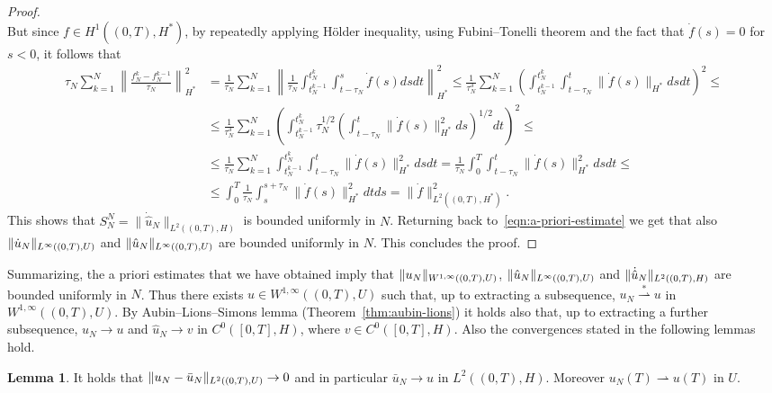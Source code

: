 \documentclass[a4paper,10pt,twoside]{amsbook}
\numberwithin{section}{chapter}
\numberwithin{equation}{chapter}
\theoremstyle{definition}
\newtheorem{lemma}[prop]{Lemma}
\DeclarePairedDelimiter{\norm}{\lVert}{\rVert}
\begin{document}
\begin{proof}
\[\]
But since $f\in H^1((0,T),H^*)$, by repeatedly applying H\"older inequality, using Fubini--Tonelli theorem and the fact that $\dot f(s)=0$ for $s<0$, it follows that
\[
\begin{split}
\tau_N\sum_{k=1}^N\left\|\frac{f_N^k-f_N^{k-1}}{\tau_N}\right\|_{H^*}^2&=\frac{1}{\tau_N}\sum_{k=1}^N\left\|\frac{1}{\tau_N}\int_{t_N^{k-1}}^{t_N^k}\int_{t-\tau_N}^s\dot{f}(s)dsdt\right\|_{H^*}^2\le\frac{1}{\tau_N^3}\sum_{k=1}^N\left(\int_{t_N^{k-1}}^{t_N^k}\int_{t-\tau_N}^t\|\dot{f}(s)\|_{H^*}dsdt\right)^2\le\\
&\le\frac{1}{\tau_N^3}\sum_{k=1}^N\left(\int_{t_N^{k-1}}^{t_N^k}\tau_N^{1/2}\left(\int_{t-\tau_N}^t\|\dot{f}(s)\|_{H^*}^2ds\right)^{1/2}dt\right)^2\le\\
&\le\frac{1}{\tau_N}\sum_{k=1}^N\int_{t_N^{k-1}}^{t_N^k}\int_{t-\tau_N}^t\|\dot{f}(s)\|_{H^*}^2dsdt=\frac{1}{\tau_N}\int_0^T\int_{t-\tau_N}^t\|\dot{f}(s)\|_{H^*}^2dsdt\le\\
&\le\int_0^T\frac{1}{\tau_N}\int_s^{s+\tau_N}\|\dot{f}(s)\|_{H^*}^2dtds=\|\dot{f}\|_{L^2((0,T),H^*)}^2.
\end{split}
\]
This shows that $S_N^N=\|\dot{\hat{u}}_N\|_{L^2((0,T),H)}$ is bounded uniformly in $N$. Returning back to~\eqref{eqn:a-priori-estimate} we get that also $\norm{\dot u_N}_{L^\infty((0,T),U)}$ and $\norm{\hat u_N}_{L^\infty((0,T),U)}$ are bounded uniformly in $N$. This concludes the proof.
\end{proof}
Summarizing, the a priori estimates that we have obtained imply that $\norm{u_N}_{W^{1,\infty}((0,T),U)}$, $\norm{\hat u_N}_{L^\infty((0,T),U)}$ and $\norm{\dot{\hat{u}}_N}_{L^2((0,T),H)}$ are bounded uniformly in $N$. Thus there exists $u\in W^{1,\infty}((0,T),U)$ such that, up to extracting a subsequence, $u_N\overset{*}{\rightharpoonup}u$ in $W^{1,\infty}((0,T),U)$. By Aubin--Lions--Simons lemma (Theorem~\ref{thm:aubin-lions}) it holds also that, up to extracting a further subsequence, $u_N\to u$ and $\hat{u}_N\to v$ in $C^0([0,T],H)$, where $v\in C^0([0,T],H)$. Also the convergences stated in the following lemmas hold.
\begin{lemma}
It holds that $\norm{u_N-\bar u_N}_{L^2((0,T),U)}\to0$ and in particular $\bar u_N\to u$ in $L^2((0,T),H)$. Moreover $u_N(T)\rightharpoonup u(T)$ in $U$.
\end{lemma}
\end{document}
